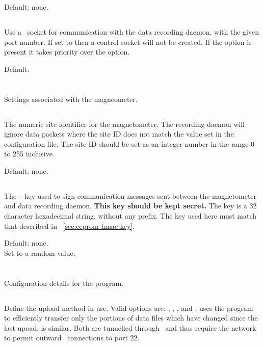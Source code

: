 Default: none.

\subsection{}
Use a \udp\ socket for communication with the data recording
daemon, with the given port number. If set to  then a
control socket will not be created. If the  option is
present it takes priority over the  option.

Default: 


\section{\code{[magnetometer]}}

Settings associated with the magneometer.

\subsection{}

The numeric site identifier for the magnetometer. The recording daemon
will ignore data packets where the site ID does not match the value
set in the configuration file. The site ID should be set as an integer
number in the range 0 to 255 inclusive.

Default: none.

\subsection{}
\label{sec:config-file-mag-key}
The \hmac-\mdfive\ key used to sign communication messages sent
between the magnetometer and data recording daemon. \textbf{This key
  should be kept secret.} The key is a 32 character hexadecimal
string, without any  prefix. The key used here must match
that described in \secname~\ref{sec:eeprom-hmac-key}.

Default: none.\\
Set to a random value.

\section{\code{[upload]}}
Configuration details for the  program.

\subsection{}
Define the upload method in use. Valid options are: ,
, , and .  uses the
 program to efficiently transfer only the portions of
data files which have changed since the last upoad;  is
similar. Both are tunnelled through \ssh\ and thus require the network
to permit outward \tcp\ connections to port 22.

